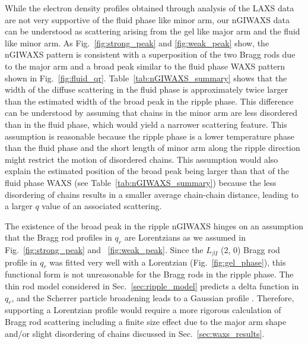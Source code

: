While the electron density profiles obtained through analysis of the LAXS data
are not very supportive of the fluid phase like minor arm,
our nGIWAXS data can be understood as scattering
arising from the gel like major arm and the fluid like minor arm. 
As Fig.~\ref{fig:strong_peak} and \ref{fig:weak_peak} show,
the nGIWAXS pattern is consistent with a superposition of 
the two Bragg rods due to the major arm and
a broad peak similar to the fluid phase 
WAXS pattern shown in Fig.~\ref{fig:fluid_qr}. 
Table~\ref{tab:nGIWAXS_summary} shows that 
the width of the diffuse scattering in the fluid phase is approximately twice
larger than the estimated width of the broad peak in the ripple phase.
This difference can be understood by assuming that chains in the minor arm
are less disordered than in the fluid phase, which would yield a narrower
scattering feature. 
This assumption is reasonable because the ripple phase is a lower temperature
phase than the fluid phase and the short length of minor arm along the 
ripple direction might restrict the motion of disordered chains. 
This assumption would also explain the estimated position 
of the broad peak being larger than that of the fluid phase WAXS
(see Table~\ref{tab:nGIWAXS_summary})
because the less disordering of chains results in a smaller average chain-chain
distance, leading to a larger $q$ value of an associated scattering.

The existence of the broad peak in the ripple nGIWAXS hinges
on an assumption that the Bragg rod profiles in $q_r$ are Lorentzians 
as we assumed in Fig.~\ref{fig:strong_peak} and ~\ref{fig:weak_peak}.
Since the $L_{\beta I}$ (2, 0) Bragg rod profile in $q_r$ was fitted very well
with a Lorentzian (Fig.~\ref{fig:gel_phase}), this functional form is
not unreasonable for the Bragg rods in the ripple phase.
The thin rod model considered in Sec.~\ref{sec:ripple_model} predicts
a delta function in $q_r$, and the Scherrer particle broadening leads to
a Gaussian profile \cite{ref:Warren69}. 
Therefore, supporting a Lorentzian profile would require
a more rigorous calculation of Bragg rod scattering including a finite size effect
due to the major arm shape and/or slight disordering of chains discussed in
Sec.~\ref{sec:waxs_results}. 


